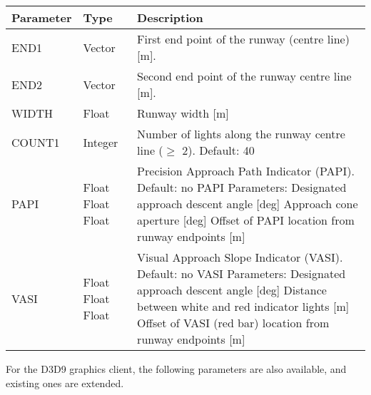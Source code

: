 \documentclass[Orbiter Developer Manual.tex]{subfiles}
\begin{document}
	\begin{longtable}{ |p{}|p{}|p{}| }
	\hline\rule{0pt}{2ex}
	\textbf{Parameter} & \textbf{Type} & \textbf{Description}\\
	\hline\rule{0pt}{2ex}
	END1 & Vector & First end point of the runway (centre line) [m].\\
	\hline\rule{0pt}{2ex}
	END2 & Vector & Second end point of the runway centre line [m].\\
	\hline\rule{0pt}{2ex}
	WIDTH & Float & Runway width [m]\\
	\hline\rule{0pt}{2ex}
	COUNT1 & Integer & Number of lights along the runway centre line ($\geq$ 2). Default: 40\\
	\hline\rule{0pt}{2ex}
	PAPI & Float Float Float & Precision Approach Path Indicator (PAPI). Default: no PAPI\newline
	Parameters:\newline
	Designated approach descent angle [deg]\newline
	Approach cone aperture [deg]\newline
	Offset of PAPI location from runway endpoints [m]\\
	\hline\rule{0pt}{2ex}
	VASI & Float Float Float & Visual Approach Slope Indicator (VASI). Default: no VASI\newline
	Parameters:\newline
	Designated approach descent angle [deg]\newline
	Distance between white and red indicator lights [m]\newline
	Offset of VASI (red bar) location from runway endpoints [m]\\
	\hline
	\end{longtable}

\noindent
For the D3D9 graphics client, the following parameters are also available, and existing ones are extended.
\end{document}
